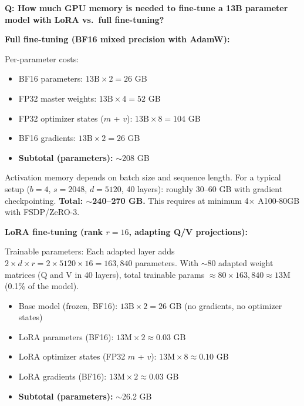\begin{interviewq}
\textbf{Q: How much GPU memory is needed to fine-tune a 13B parameter model with LoRA vs.\ full fine-tuning?}

 \quad {} \quad \badgefreq{\freqhigh}

\stronganswer

\textbf{Full fine-tuning (BF16 mixed precision with AdamW):}

Per-parameter costs:
\begin{itemize}
    \item BF16 parameters: $13\text{B} \times 2 = 26$ GB
    \item FP32 master weights: $13\text{B} \times 4 = 52$ GB
    \item FP32 optimizer states ($m$ + $v$): $13\text{B} \times 8 = 104$ GB
    \item BF16 gradients: $13\text{B} \times 2 = 26$ GB
    \item \textbf{Subtotal (parameters):} $\sim$208 GB
\end{itemize}

Activation memory depends on batch size and sequence length. For a typical setup ($b=4$, $s=2048$, $d=5120$, 40 layers): roughly 30--60 GB with gradient checkpointing. \textbf{Total: $\sim$240--270 GB.} This requires at minimum 4$\times$ A100-80GB with FSDP/ZeRO-3.

\textbf{LoRA fine-tuning (rank $r = 16$, adapting Q/V projections):}

Trainable parameters: Each adapted layer adds $2 \times d \times r = 2 \times 5120 \times 16 = 163{,}840$ parameters. With $\sim$80 adapted weight matrices (Q and V in 40 layers), total trainable params $\approx 80 \times 163{,}840 \approx 13\text{M}$ (0.1\% of the model).
\begin{itemize}
    \item Base model (frozen, BF16): $13\text{B} \times 2 = 26$ GB (no gradients, no optimizer states)
    \item LoRA parameters (BF16): $13\text{M} \times 2 \approx 0.03$ GB
    \item LoRA optimizer states (FP32 $m$ + $v$): $13\text{M} \times 8 \approx 0.10$ GB
    \item LoRA gradients (BF16): $13\text{M} \times 2 \approx 0.03$ GB
    \item \textbf{Subtotal (parameters):} $\sim$26.2 GB
\end{itemize}


\end{interviewq}
